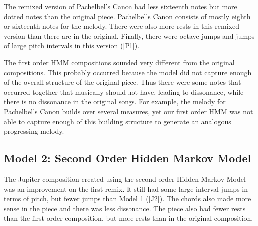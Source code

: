 \documentclass{article} %
\begin{document}
The remixed version of Pachelbel's Canon had less sixteenth notes but more dotted notes than the original piece. Pachelbel's Canon consists of mostly eighth or sixteenth notes for the melody. There were also more rests in this remixed version than there are in the original. Finally, there were  octave jumps and jumps of large pitch intervals in this version (\autoref{P1}).

The first order HMM compositions sounded very different from the original compositions. This probably occurred because the model did not capture enough of the overall structure of the original piece. Thus there  were some notes that occurred together that musically should not have, leading to dissonance, while  there is no dissonance in the original songs. For example, the melody for Pachelbel's Canon builds over several measures, yet our first order HMM was not able to capture enough of this building structure to generate an analogous progressing melody. 


\subsection{Model 2: Second Order Hidden Markov Model}

The Jupiter composition created using the second order Hidden Markov Model was an improvement on the first remix. It still had some large interval jumps in terms of pitch, but fewer jumps than Model 1 (\autoref{J2}). The chords also made more sense in the piece and there was less dissonance. The piece also had fewer rests than the first order composition, but more rests than in the original composition.
\end{document}

